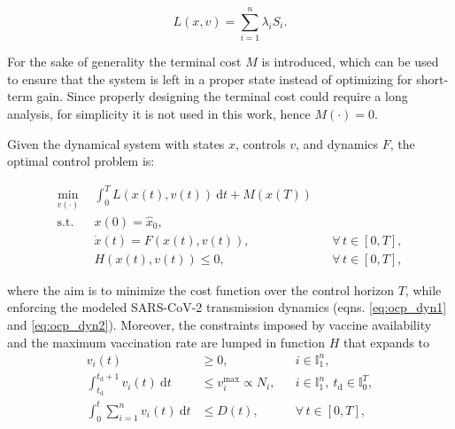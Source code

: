 \begin{equation*}
    L(x,v) = \sum_{i=1}^n \lambda_i S_i.
\end{equation*}

For the sake of generality the terminal cost $M$ is introduced, which can be used to ensure that the system is left in a proper state instead of optimizing for short-term gain. Since properly designing the terminal cost could require a long analysis, for simplicity it is not used in this work, hence $M(\cdot) = 0$.

Given the dynamical system with states $x$, controls $v$, and dynamics $F$, the optimal control problem is:

\begin{subequations}
    \label{eq:ocp}
    \begin{align}
        \min_{v(\cdot)} \ \ & \int_{0}^{T} L(x(t),v(t)) \ \mathrm{d}t + M(x(T)) \\ \label{eq:ocp_dyn1}
        \mathrm{s.t.} \ \ & x(0) = \hat x_0, \\ \label{eq:ocp_dyn2}
        &\dot x(t) = F(x(t),v(t)), && \forall \, t\in[0,T], \\ 
        &H(x(t),v(t)) \leq 0, && \forall \, t\in[0,T],
    \end{align}
\end{subequations}

where the aim is to minimize the cost function over the control horizon $T$, while enforcing the modeled SARS-CoV-2 transmission dynamics (eqns. \eqref{eq:ocp_dyn1} and \eqref{eq:ocp_dyn2}). Moreover, the constraints imposed by vaccine availability and the maximum vaccination rate are lumped in function $H$ that expands to
\begin{subequations}
    \begin{align}
        v_i(t) &\geq 0, && i\in\mathbb{I}_1^n, \label{eq:constr_vacc_met} \\
        \int_{t_\mathrm{d}}^{t_\mathrm{d}+1} v_i(t) \ \mathrm{d}t &\leq v_i^\mathrm{max} \propto N_i, && i\in\mathbb{I}_1^n,\ t_\mathrm{d} \in \mathbb{I}_0^T,  \label{eq:constr_day_met} \\
        \int_{0}^{t} \sum_{i=1}^n v_i(t) \ \mathrm{d}t &\leq D(t), && \forall \, t\in[0,T], \label{eq:constr_week_met}
    \end{align}
\end{subequations}


